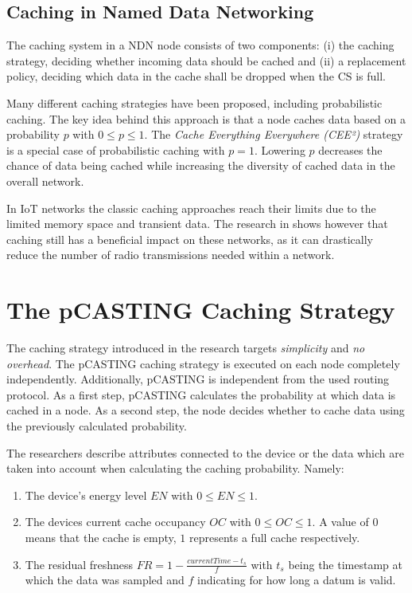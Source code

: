 \documentclass[conference]{IEEEtran}
\begin{document}
\subsection{Caching in Named Data Networking}

The caching system in a NDN node consists of two components: (i) the caching strategy, deciding whether incoming data should be cached and (ii) a replacement policy, deciding which data in the cache shall be dropped when the CS is full.

Many different caching strategies have been proposed, including probabilistic caching\cite{Tarnoi2014}. The key idea behind this approach is that a node caches data based on a probability $p$ with $0 \leq p \leq 1$. The \textit{Cache Everything Everywhere (CEE²)} strategy is a special case of probabilistic caching with $p = 1$. Lowering $p$ decreases the chance of data being cached while increasing the diversity of cached data in the overall network.

In IoT networks the classic caching approaches reach their limits due to the limited memory space and transient data. The research in \cite{Baccelli2014} shows however that caching still has a beneficial impact on these networks, as it can drastically reduce the number of radio transmissions needed within a network.

\section{The pCASTING Caching Strategy}
\label{sec:pcasting}

The caching strategy introduced in the research targets \textit{simplicity} and \textit{no overhead}. The pCASTING caching strategy is executed on each node completely independently. Additionally, pCASTING is independent from the used routing protocol\cite{Amadeo2014}. As a first step, pCASTING calculates the probability at which data is cached in a node. As a second step, the node decides whether to cache data using the previously calculated probability.

The researchers describe attributes connected to the device or the data which are taken into account when calculating the caching probability. Namely:
\begin{enumerate}
	\item The device's energy level $EN$ with $0 \leq EN \leq 1$.
	\item The devices current cache occupancy $OC$ with $0 \leq OC \leq 1$. A value of $0$ means that the cache is empty, $1$ represents a full cache respectively.
	\item The residual freshness $FR = 1 - \frac{currentTime - t_s}{f}$ with $t_s$ being the timestamp at which the data was sampled and $f$ indicating for how long a datum is valid.
\end{enumerate} 
\end{document}
